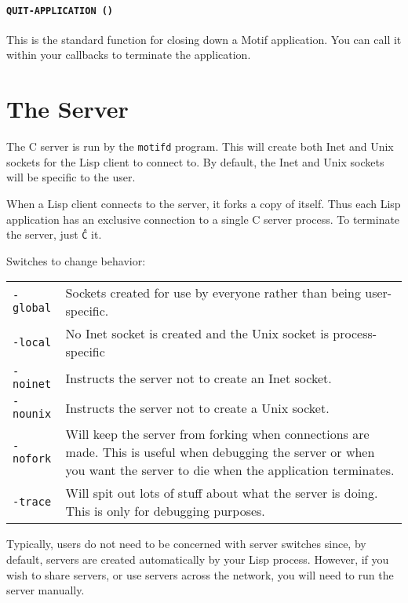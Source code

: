 \documentclass{article}
\begin{document}
\paragraph{\texttt{QUIT-APPLICATION ()}} This is the standard function
for closing down a Motif application.  You can call it within your
callbacks to terminate the application.


\section{The Server}

The C server is run by the \texttt{motifd} program.  This will create
both Inet and Unix sockets for the Lisp client to connect to.  By
default, the Inet and Unix sockets will be specific to the user.

When a Lisp client connects to the server, it forks a copy of itself.
Thus each Lisp application has an exclusive connection to a single C
server process.  To terminate the server, just \texttt{\^C} it.

\noindent
Switches to change behavior:\\[2mm]
\begin{tabular}{lp{}}
\texttt{-global} & Sockets created for use by everyone rather than
	           being user-specific.\\
\texttt{-local } & No Inet socket is created and the Unix socket is
	           process-specific\\
\texttt{-noinet} & Instructs the server not to create an Inet socket.\\
\texttt{-nounix} & Instructs the server not to create a Unix socket.\\
\texttt{-nofork} & Will keep the server from forking when connections are
	           made.  This is useful when debugging the server or when
	           you want the server to die when the application
	           terminates.\\
\texttt{-trace}  & Will spit out lots of stuff about what the server is
	           doing.  This is only for debugging purposes.
\end{tabular}

\vspace{2mm}
	
Typically, users do not need to be concerned with server switches
since, by default, servers are created automatically by your Lisp
process.  However, if you wish to share servers, or use servers across
the network, you will need to run the server manually.
\end{document}
